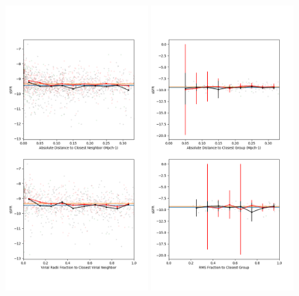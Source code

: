 \begin{figure}
    \includegraphics[width=0.49\textwidth]{Images/smallScaleEnvironment/dwarf_sSFR_300}
    \includegraphics[width=0.49\textwidth]{Images/smallScaleEnvironment/dwarf_sSFR_300_group}

\end{figure}
